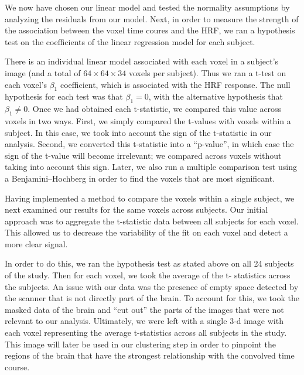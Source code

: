
\par \indent We now have chosen our linear model and tested the normality
assumptions by analyzing the residuals from our model. Next, in order to
measure the strength of the association between the voxel time coures and the
HRF, we ran a hypothesis test on the coefficients of the linear regression
model for each subject.

\par There is an individual linear model associated with each voxel in a
subject’s image (and a total of $64 \times 64 \times 34$ voxels per subject).
Thus we ran a t-test on each voxel's $\beta_1$ coefficient, which is associated
with the HRF response. The null hypothesis for each test was that $ \beta_1=
0$, with the alternative hypothesis that $\beta_1 \neq 0$. Once we had obtained
each t-statistic, we compared this value across voxels in two ways. First, we
simply compared the t-values with voxels within a subject. In this case, we
took into account the sign of the t-statistic in our analysis. Second, we
converted this t-statistic into a ``p-value'', in which case the sign of the
t-value will become irrelevant; we compared across voxels without taking
into account this sign. Later, we also run a multiple comparison test using a
Benjamini–Hochberg in order to find the voxels that are most significant.

\par Having implemented a method to compare the voxels within a single subject,
we next examined our results for the same voxels across subjects. Our initial
approach was to aggregate the t-statistic data between all subjects for each
voxel. This allowed us to decrease the variability of the fit on each voxel and
detect a more clear signal.

\par In order to do this, we ran the hypothesis test as stated above on all 24
subjects of the study. Then for each voxel, we took the average of the t-
statistics across the subjects. An issue with our data was the presence of
empty space detected by the scanner that is not directly part of the brain. To
account for this, we took the masked data of the brain and ``cut out'' the
parts of the images that were not relevant to our analysis. Ultimately, we were
left with a single 3-d image with each voxel representing the average
t-statistics across all subjects in the study. This image will later be used in
our clustering step in order to pinpoint the regions of the brain that have the
strongest relationship with the convolved time course.
